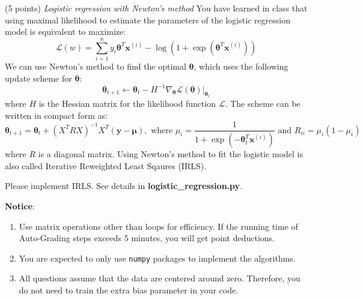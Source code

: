 \documentclass[a4paper, 12pt]{exam}
\begin{document}
\begin{questions}
		\question (5 points) \emph{Logistic regression with Newton's method} You have learned in class that using maximal likelihood to estimate the parameters of the logistic regression model is equivalent to maximize:
		\begin{equation*}
		\mathcal{L}(w) = \sum_{i=1}^n y_i \bm{\theta}^T \bm{x}^{(i)} - \log ( 1 + \exp(\bm{\theta}^T \bm{x}^{(i)}))
		\end{equation*}
		We can use Newton's method to find the optimal $\bm{\theta}$, which uses the following update scheme for $\bm{\theta}$:
		\begin{equation*}
		\bm{\theta}_{t+1} \leftarrow \bm{\theta}_t - H^{-1} \nabla_{\bm{\theta}} \mathcal{L}(\bm{\theta})|_{\bm{\theta}_t}
		\end{equation*}
		where $H$ is the Hessian matrix for the likelihood function $\mathcal{L}$.
		The scheme can be written in compact form as:
		\begin{equation*}
		\bm{\theta}_{t+1} = \bm{\theta}_t + (X^TRX)^{-1} X^T(\bm{y}-\bm{\mu}), \textrm{ where } \mu_i = \frac{1}{1+\exp(-\bm{\theta}_t^T\bm{x}^{(i)})} \textrm{ and } R_{ii} = \mu_i ( 1 - \mu_i)
		\end{equation*}
		where $R$ is a diagonal matrix. Using Newton's method to fit the logistic model is also called Iterative Reweighted Least Sqaures (IRLS).
		
		Please implement IRLS. See details in \textbf{logistic\_regression.py}.
		
	\end{questions}
	
	
	\nocite{*}
	\begin{flushleft}
		\textbf{Notice}: \\
		\begin{enumerate}
			\item Use matrix operations other than loops for efficiency. If the running time of Auto-Grading steps exceeds 5 minutes, you will get point deductions.
			\item You are expected to only use \texttt{numpy} packages to implement the algorithms.
			\item All questions assume that the data are centered around zero. Therefore, you do not need to train the extra bias parameter in your code.
		\end{enumerate}
	\end{flushleft}
	
\end{document}
